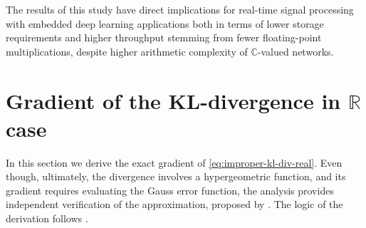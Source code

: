 \documentclass[a4paper,10pt,onecolumn]{article}
\newcommand{\real}{\mathbb{R}}
\newcommand{\cplx}{\mathbb{C}}
\begin{document}
The results of this study have direct implications for real-time signal processing with
embedded deep learning applications both in terms of lower storage requirements and higher
throughput stemming from fewer floating-point multiplications, despite higher arithmetic
complexity of $\cplx$-valued networks.







\appendix
\onecolumn

\section{Gradient of the KL-divergence in $\real$ case} %
\label{sec:real-chisq-grad}  %

In this section we derive the exact gradient of \eqref{eq:improper-kl-div-real}. Even
though, ultimately, the divergence involves a hypergeometric function, and its gradient
requires evaluating the Gauss error function, the analysis provides independent verification
of the approximation, proposed by \citet{molchanov_variational_2017}. The logic of the
derivation follows \citet{lapidoth_capacity_2003}.
\end{document}
